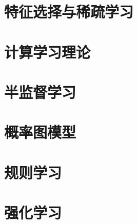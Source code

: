 \documentclass[UTF8]{ctexart}
\numberwithin{equation}{section}
\begin{document}
\section{特征选择与稀疏学习}
% 
\newpage

\section{计算学习理论}
% 
\newpage

\section{半监督学习}
% 
\newpage

\section{概率图模型}
% 
\newpage

\section{规则学习}
% 
\newpage

\section{强化学习}
% 
\newpage
\end{document}
